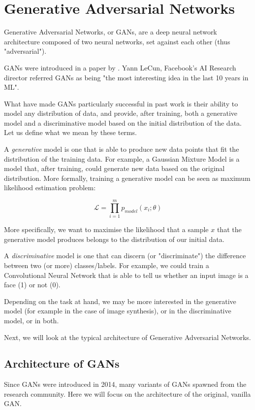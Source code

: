 
\section{Generative Adversarial Networks}
\label{sec:gan}
Generative Adversarial Networks, or GANs, are a deep neural network architecture composed of two neural networks, set against each other (thus "adversarial").

GANs were introduced in a paper by \cite{goodfellow2014generative}. Yann LeCun, Facebook's AI Research director referred GANs as being "the most interesting idea in the last 10 years in ML".

What have made GANs particularly successful in past work is their ability to model any distribution of data, and provide, after training, both a generative model and a discriminative model based on the initial distribution of the data. Let us define what we mean by these terms.

A \textit{generative} model is one that is able to produce new data points that fit the distribution of the training data. For example, a Gaussian Mixture Model is a model that, after training, could generate new data based on the original distribution. More formally, training a generative model can be seen as maximum likelihood estimation problem:

\[\mathscr{L} = \prod_{i=1}^{m} p_{model}(x_i;\theta)\]

More specifically, we want to maximise the likelihood that a sample $x$ that the generative model produces belongs to the distribution of our initial data.

A \textit{discriminative} model is one that can discern (or "discriminate") the difference between two (or more) classes/labels. For example, we could train a Convolutional Neural Network that is able to tell us whether an input image is a face (1) or not (0).

Depending on the task at hand, we may be more interested in the generative model (for example in the case of image synthesis), or in the discriminative model, or in both.

Next, we will look at the typical architecture of Generative Adversarial Networks.

\subsection{Architecture of GANs}
Since GANs were introduced in 2014, many variants of GANs spawned from the research community. Here we will focus on the architecture of the original, vanilla GAN.

